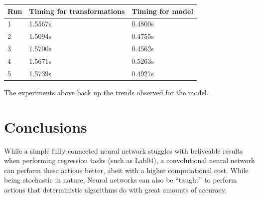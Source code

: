 \documentclass[conference]{IEEEtran}
\begin{document}
\begin{center}
    \begin{tabular}{|l|l|l|}
        \hline
        Run & Timing for transformations & Timing for model \\ \hline
        1 & 1.5567s & 0.4800s \\ \hline
        2 & 1.5094s & 0.4755s \\ \hline
        3 & 1.5700s & 0.4562s \\ \hline
        4 & 1.5671s & 0.5263s \\ \hline
        5 & 1.5739s & 0.4927s \\ \hline
    \end{tabular}
\end{center}

The experiments above back up the trends observed for the model.

\section{Conclusions}
While a simple fully-connected neural network stuggles with beliveable results when performing regression tasks (such as Lab04),
a convolutional neural network can perform these actions better, abeit with a higher computational cost. While being stochastic
in nature, Neural networks can also be ``taught'' to perform actions that deterministic algorithms do with great amounts of
accuracy.
\end{document}
